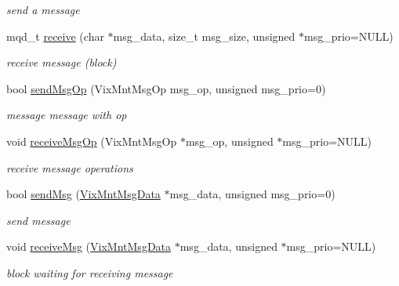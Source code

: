 \begin{DoxyCompactItemize}
\begin{DoxyCompactList}\small\item\em send a message \end{DoxyCompactList}\item 
mqd\+\_\+t \hyperlink{class_vix_mnt_msg_que_ad73da8c8df46a7f9a3dec2c6adab38d2}{receive} (char $\ast$msg\+\_\+data, size\+\_\+t msg\+\_\+size, unsigned $\ast$msg\+\_\+prio=N\+U\+LL)
\begin{DoxyCompactList}\small\item\em receive message (block) \end{DoxyCompactList}\item 
bool \hyperlink{class_vix_mnt_msg_que_a1da1dc845dc75159916384a51a1b3925}{send\+Msg\+Op} (Vix\+Mnt\+Msg\+Op msg\+\_\+op, unsigned msg\+\_\+prio=0)
\begin{DoxyCompactList}\small\item\em message message with op \end{DoxyCompactList}\item 
void \hyperlink{class_vix_mnt_msg_que_a554c768d90484fcf533831034146914a}{receive\+Msg\+Op} (Vix\+Mnt\+Msg\+Op $\ast$msg\+\_\+op, unsigned $\ast$msg\+\_\+prio=N\+U\+LL)
\begin{DoxyCompactList}\small\item\em receive message operations \end{DoxyCompactList}\item 
bool \hyperlink{class_vix_mnt_msg_que_a45df4e786921e87a7adfa651eb06f3d9}{send\+Msg} (\hyperlink{class_vix_mnt_msg_data}{Vix\+Mnt\+Msg\+Data} $\ast$msg\+\_\+data, unsigned msg\+\_\+prio=0)
\begin{DoxyCompactList}\small\item\em send message \end{DoxyCompactList}\item 
void \hyperlink{class_vix_mnt_msg_que_ac710f60f5b4fef6ea1e38db0a0158882}{receive\+Msg} (\hyperlink{class_vix_mnt_msg_data}{Vix\+Mnt\+Msg\+Data} $\ast$msg\+\_\+data, unsigned $\ast$msg\+\_\+prio=N\+U\+LL)
\begin{DoxyCompactList}\small\item\em block waiting for receiving message \end{DoxyCompactList}\end{DoxyCompactItemize}
